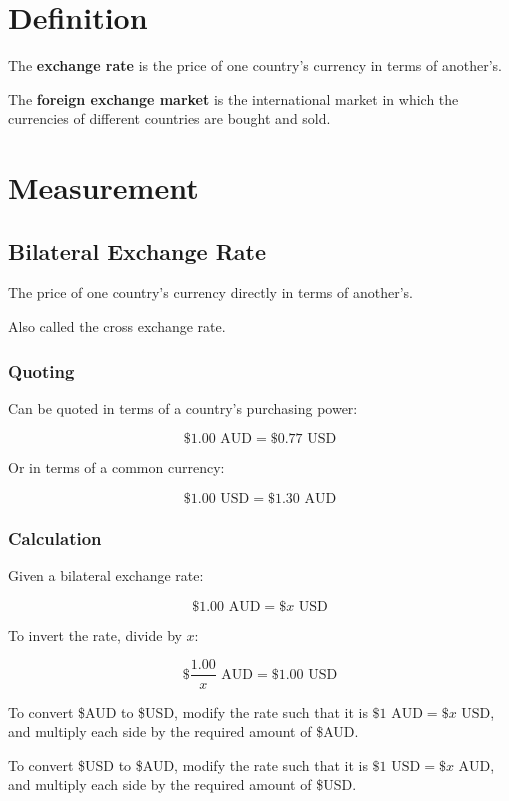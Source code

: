 \documentclass[a4paper,11pt]{report}
\begin{document}
\section{Definition}

The \textbf{exchange rate} is the price of one country's currency in terms of
another's.

The \textbf{foreign exchange market} is the international market in which the
currencies of different countries are bought and sold.


\section{Measurement}

\subsection{Bilateral Exchange Rate}

The price of one country's currency directly in terms of another's.

Also called the cross exchange rate.

\subsubsection{Quoting}

Can be quoted in terms of a country's purchasing power:

$$
\$1.00\text{ AUD} = \$0.77\text{ USD}
$$

Or in terms of a common currency:

$$
\$1.00\text{ USD} = \$1.30\text{ AUD}
$$

\subsubsection{Calculation}

Given a bilateral exchange rate:

$$
\$1.00\text{ AUD} = \$x \text{ USD}
$$

To invert the rate, divide by $x$:

$$
\$\frac{1.00}{x}\text{ AUD} = \$1.00\text{ USD}
$$

To convert \$AUD to \$USD, modify the rate such that it is
$\$1\text{ AUD} = \$x\text{ USD}$, and multiply each side by the required
amount of \$AUD.

To convert \$USD to \$AUD, modify the rate such that it is
$\$1\text{ USD} = \$x\text{ AUD}$, and multiply each side by the required
amount of \$USD.
\end{document}
